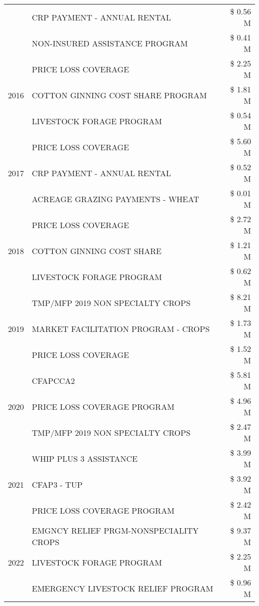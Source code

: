 \begin{tabular}{llr}
 & CRP PAYMENT - ANNUAL RENTAL & \$ 0.56 M \\
 & NON-INSURED ASSISTANCE PROGRAM & \$ 0.41 M \\
\cline{1-3}
\multirow[t]{3}{*}{2016} & PRICE LOSS COVERAGE & \$ 2.25 M \\
 & COTTON GINNING COST SHARE PROGRAM & \$ 1.81 M \\
 & LIVESTOCK FORAGE PROGRAM & \$ 0.54 M \\
\cline{1-3}
\multirow[t]{3}{*}{2017} & PRICE LOSS COVERAGE & \$ 5.60 M \\
 & CRP PAYMENT - ANNUAL RENTAL & \$ 0.52 M \\
 & ACREAGE GRAZING PAYMENTS - WHEAT & \$ 0.01 M \\
\cline{1-3}
\multirow[t]{3}{*}{2018} & PRICE LOSS COVERAGE & \$ 2.72 M \\
 & COTTON GINNING COST SHARE & \$ 1.21 M \\
 & LIVESTOCK FORAGE PROGRAM & \$ 0.62 M \\
\cline{1-3}
\multirow[t]{3}{*}{2019} & TMP/MFP 2019 NON SPECIALTY CROPS & \$ 8.21 M \\
 & MARKET FACILITATION PROGRAM - CROPS & \$ 1.73 M \\
 & PRICE LOSS COVERAGE & \$ 1.52 M \\
\cline{1-3}
\multirow[t]{3}{*}{2020} & CFAPCCA2 & \$ 5.81 M \\
 & PRICE LOSS COVERAGE PROGRAM & \$ 4.96 M \\
 & TMP/MFP 2019 NON SPECIALTY CROPS & \$ 2.47 M \\
\cline{1-3}
\multirow[t]{3}{*}{2021} & WHIP PLUS 3 ASSISTANCE & \$ 3.99 M \\
 & CFAP3 - TUP & \$ 3.92 M \\
 & PRICE LOSS COVERAGE PROGRAM & \$ 2.42 M \\
\cline{1-3}
\multirow[t]{3}{*}{2022} & EMGNCY RELIEF PRGM-NONSPECIALITY CROPS & \$ 9.37 M \\
 & LIVESTOCK FORAGE PROGRAM & \$ 2.25 M \\
 & EMERGENCY LIVESTOCK RELIEF PROGRAM & \$ 0.96 M \\
\cline{1-3}
\bottomrule
\end{tabular}
